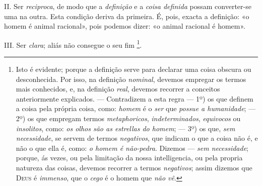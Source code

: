 II. Ser \emph{reciproca}, de modo que a \emph{definição} e a \emph{coisa definida} possam converter-se uma na outra. Esta condição deriva da primeira. É, pois, exacta a definição: «o homem é animal racional», pois podemos dizer: «o animal racional é homem».

III. Ser \emph{clara}; aliás não consegue o seu fim \footnote{Isto é evidente; porque a definição serve para declarar uma coisa obscura ou desconhecida. Por isso, na definição \emph{nominal}, devemos empregar os termos mais conhecidos, e, na definição \emph{real}, devemos recorrer a conceitos anteriormente explicados. --- Contradizem a esta regra --- 1º) os que definem a coisa pela própria coisa, como: \emph{homem} é o \emph{ser} que \emph{possue a humanidade}; --- 2º) os que empregam termos \emph{metaphoricos}, \emph{indeterminados}, \emph{equivocos} ou \emph{insolitos}, como: \emph{os olhos são as estrellas do homem}; --- 3º) os que, \emph{sem necessidade}, se servem de termos \emph{negativos}, que indicam o que a coisa não é, e não o que ella é, como: \emph{o homem é não-pedra}. Dizemos --- \emph{sem necessidade}; porque, ás vezes, ou pela limitação da nossa intelligencia, ou pela propria natureza das coisas, devemos recorrer a termos \emph{negativos}; assim dizemos que \textsc{Deus} é \emph{immenso}, que o \emph{cego} é o homem que \emph{não vê}.}.

